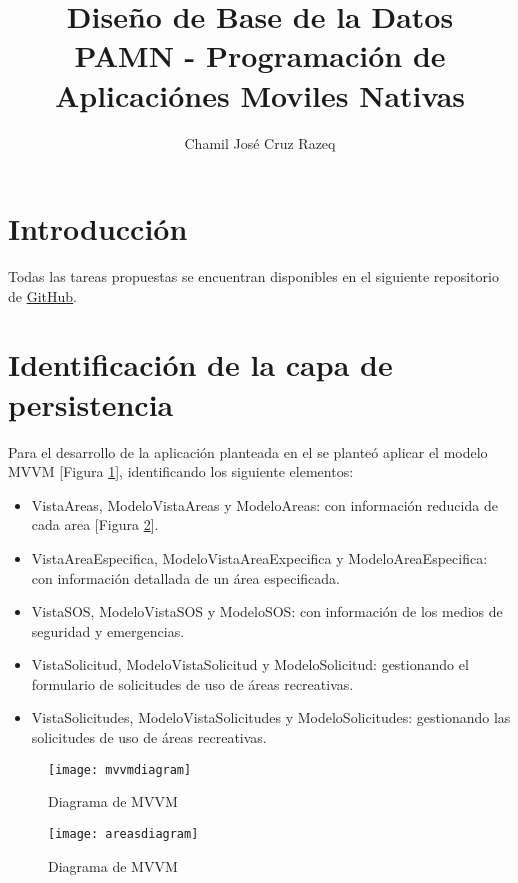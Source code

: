\documentclass{article}
\title{Diseño de Base de la Datos \\[3ex] \small PAMN - Programación de Aplicaciónes Moviles Nativas}
\author{Chamil José Cruz Razeq}
\begin{document}
    \maketitle
    \thispagestyle{empty}
    \newpage

    \section{Introducción}
        Todas las tareas propuestas se encuentran disponibles en el siguiente
         repositorio de \href{https://github.com/chamilstudy/ulpgc_pamn_assigments}{GitHub}.

    \section{Identificación de la capa de persistencia}
    Para el desarrollo de la aplicación planteada en el \cite[Lab 3]{lab3} se planteó aplicar
     el modelo MVVM [Figura \ref{fig:mvvmdiagram}], identificando los siguiente elementos:
    
    \begin{itemize}
        \item VistaAreas, ModeloVistaAreas y ModeloAreas: con información reducida
               de cada area [Figura \ref{fig:areasdiagram}].
        \item VistaAreaEspecifica, ModeloVistaAreaExpecifica y ModeloAreaEspecifica:
               con información detallada de un área especificada.
        \item VistaSOS, ModeloVistaSOS y ModeloSOS: con información de los medios de
               seguridad y emergencias.
        \item VistaSolicitud, ModeloVistaSolicitud y ModeloSolicitud: gestionando el
               formulario de solicitudes de uso de áreas recreativas.
        \item VistaSolicitudes, ModeloVistaSolicitudes y ModeloSolicitudes: gestionando
               las solicitudes de uso de áreas recreativas.
    \end{itemize}

    \begin{figure}[H]
        \centerline{\texttt{[image: mvvmdiagram]}}
        \caption{Diagrama de MVVM}
        \label{fig:mvvmdiagram}
    \end{figure}

    \begin{figure}[H]
        \centerline{\texttt{[image: areasdiagram]}}
        \caption{Diagrama de MVVM}
        \label{fig:areasdiagram}
    \end{figure}
    
\end{document}
